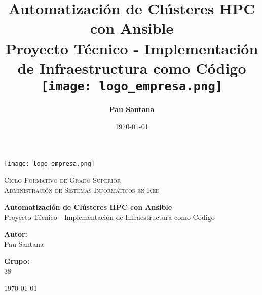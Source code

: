 \documentclass[12pt,a4paper]{report}
\title{\Huge{\textcolor{cientigo-blue}{\textbf{Automatización de Clústeres HPC con Ansible}}}\\[0.5cm]
       \Large{\textcolor{cientigo-gray}{Proyecto Técnico - Implementación de Infraestructura como Código}}\\[0.5cm]
       \texttt{[image: logo\_empresa.png]}}
\author{\Large{\textbf{Pau Santana}}}
\date{\today}
\begin{document}
\begin{titlepage}
\begin{center}
\vspace*{1cm}
\texttt{[image: logo\_empresa.png]}\\[1.5cm]

\begin{tcolorbox}[
  colback=white,
  colframe=cientigo-blue,
  arc=0mm,
  boxrule=2pt,
  width=\textwidth,
  halign=center,
  valign=center,
  height=3cm
]
\textsc{\LARGE{\textcolor{cientigo-blue}{Ciclo Formativo de Grado Superior}}}\\[0.3cm]
\textsc{\Large{\textcolor{cientigo-gray}{Administración de Sistemas Informáticos en Red}}}
\end{tcolorbox}

\vspace{1cm}

\begin{tcolorbox}[
  colback=cientigo-blue!10,
  colframe=cientigo-blue,
  arc=0mm,
  boxrule=2pt,
  width=\textwidth,
  halign=center,
  valign=center,
  height=5cm
]
{\huge\bfseries\textcolor{cientigo-blue}{Automatización de Clústeres HPC con Ansible}}\\[0.5cm]
{\Large\textcolor{cientigo-gray}{Proyecto Técnico - Implementación de Infraestructura como Código}}
\end{tcolorbox}

\vspace{1cm}

\begin{minipage}{0.45\textwidth}
\begin{tcolorbox}[
  colback=white,
  colframe=cientigo-blue,
  arc=0mm,
  boxrule=1pt,
  width=\textwidth,
  halign=center
]
\large
\textbf{\textcolor{cientigo-blue}{Autor:}}\\
\textcolor{cientigo-gray}{Pau Santana}
\end{tcolorbox}
\end{minipage}
\hfill
\begin{minipage}{0.45\textwidth}
\begin{tcolorbox}[
  colback=white,
  colframe=cientigo-blue,
  arc=0mm,
  boxrule=1pt,
  width=\textwidth,
  halign=center
]
\large
\textbf{\textcolor{cientigo-blue}{Grupo:}}\\
\textcolor{cientigo-gray}{38}
\end{tcolorbox}
\end{minipage}

\vfill

\begin{tcolorbox}[
  colback=white,
  colframe=cientigo-blue,
  arc=0mm,
  boxrule=1pt,
  width=0.5\textwidth,
  halign=center
]
{\large \textcolor{cientigo-gray}{\today}}
\end{tcolorbox}

\end{center}
\end{titlepage}
\end{document}
